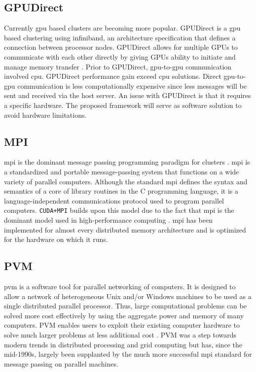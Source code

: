 \subsection{GPUDirect}

Currently \gls{gpu} based clusters are becoming more popular. GPUDirect is a
\gls{gpu} based clustering using infiniband, an architecture specification that
defines a connection between processor nodes. GPUDirect allows for multiple
GPUs to communicate with each other directly by giving GPUs ability to initiate
and manage memory transfer \cite{website:YouTube}. Prior to GPUDirect,
\gls{gpu}-to-\gls{gpu} communication involved \gls{cpu}. GPUDirect performance
gain exceed \gls{cpu} solutions. Direct \gls{gpu}-to-\gls{gpu} communication
is less computationally expensive since less messages will be sent and received
via the host server. An issue with GPUDirect is that it requires a specific
hardware. The proposed framework will serve as software solution to avoid
hardware limitations.


\subsection{MPI}

\Gls{mpi} is the dominant message passing programming paradigm for clusters
\cite{website:Message-Passing-Interface-Forum}
\cite{website:Message-Passing-Interface}. \gls{mpi} is a standardized and
portable message-passing system that functions on a wide variety of parallel
computers. Although the standard \gls{mpi} defines the syntax and semantics of
a core of library routines in the C programming language, it is a
language-independent communications protocol used to program parallel
computers. \texttt{CUDA+MPI} builds upon this model due to the fact that
\gls{mpi} is the dominant model used in high-performance computing
\cite{sur2006high}. \Gls{mpi} has been implemented for almost every distributed
memory architecture and is optimized for the hardware on which it runs.

\subsection{PVM}

\Gls{pvm} is a software tool for parallel networking of computers. It is
designed to allow a network of heterogeneous Unix and/or Windows machines to be
used as a single distributed parallel processor. Thus, large computational
problems can be solved more cost effectively by using the aggregate power and
memory of many computers. PVM enables users to exploit their existing computer
hardware to solve much larger problems at less additional cost
\cite{website:Computer-Science-and-Division}. PVM was a step towards modern
trends in distributed processing and grid computing but has, since the
mid-1990s, largely been supplanted by the much more successful \gls{mpi}
standard for message passing on parallel machines.

